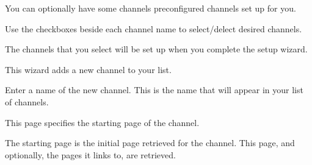 You can optionally have some channels preconfigured channels set up for you.

Use the checkboxes beside each channel name to select/delect desired channels.

The channels that you select will be set up when you complete the
setup wizard.


This wizard adds a new \brandingapplicationsuitename channel to your list.


Enter a name of the new channel. This is the name that will appear in your
list of channels.



This page specifies the starting page of the channel.

The starting page is the initial page retrieved for the channel. This page,
and optionally, the pages it links to, are retrieved.

